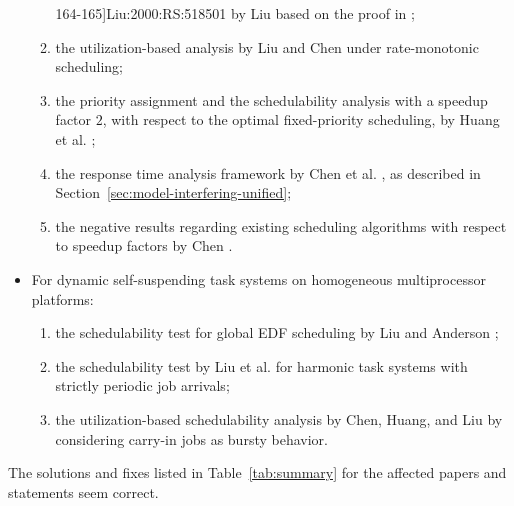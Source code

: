 \begin{itemize}
\begin{enumerate}
    164-165]{Liu:2000:RS:518501} by Liu based on the proof in \cite{ChenHuangNelissen,ChenECRTS2016-suspension}; 
  \item the utilization-based analysis by Liu and Chen
    \cite{LiuChen:rtss2014} under rate-monotonic scheduling;
  \item the priority assignment and the schedulability analysis with a
    speedup factor $2$, with respect to the optimal fixed-priority
    scheduling, by Huang et
    al. \cite{huangpass:dac2015};
  \item the response time analysis framework by Chen et al. \cite{ChenECRTS2016-suspension}, as described in Section~\ref{sec:model-interfering-unified};
  \item the negative results regarding existing scheduling algorithms with respect to speedup factors by Chen \cite{RTSS2016-suspension}.
  \end{enumerate}
\item For dynamic self-suspending task systems on homogeneous multiprocessor
  platforms:
  \begin{enumerate}
  \item the schedulability test for global EDF scheduling by Liu and
    Anderson \cite{DBLP:conf/ecrts/LiuA13};
  \item the schedulability test by Liu et
    al. \cite{DBLP:conf/ecrts/LiuCH014} for harmonic task
    systems with strictly periodic job arrivals;
  \item the utilization-based schedulability analysis by Chen, Huang,
    and Liu \cite{ChenHLRTSS2015} by considering carry-in jobs as
    bursty behavior.
  \end{enumerate}
\end{itemize}
The solutions and fixes listed in Table~\ref{tab:summary} for the
affected papers and statements seem correct.






